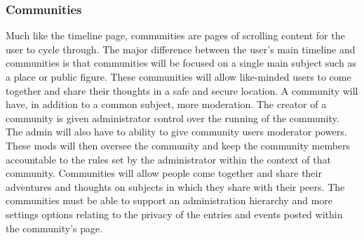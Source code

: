 \documentclass[compsoc, 10, draftclsnofoot, onecolumn]{IEEEtran}
\begin{document}
\subsubsection{Communities}
Much like the timeline page, communities are pages of scrolling content for the user to cycle through. The major difference between the user's main timeline and communities is that communities will be focused on a single main subject such as a place or public figure. These communities will allow like-minded users to come together and share their thoughts in a safe and secure location. A community will have, in addition to a common subject, more moderation. The creator of a community is given administrator control over the running of the community. The admin will also have to ability to give community users moderator powers. These mods will then oversee the community and keep the community members accountable to the rules set by the administrator within the context of that community. Communities will allow people come together and share their adventures and thoughts on subjects in which they share with their peers. The communities must be able to support an administration hierarchy and more settings options relating to the privacy of the entries and events posted within the community's page.  
\end{document}
